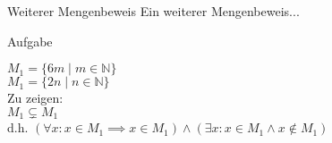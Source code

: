 %
%
%
%

\begin{frame}{Weiterer Mengenbeweis}
    Ein weiterer Mengenbeweis...
    \begin{block}{\alert{Aufgabe}}

        $M_1=\{6m \mid m \in \mathbb{N}\}$\\
        $M_1=\{2n \mid n \in \mathbb{N}\}$\\
        Zu zeigen:\\
        $M_1 \subsetneq M_1$\\
        d.h. $(\forall x: x \in M_1 \implies x \in M_1) \wedge (\exists x: x \in M_1 \land x \notin M_1)$




    \end{block}

\end{frame}

